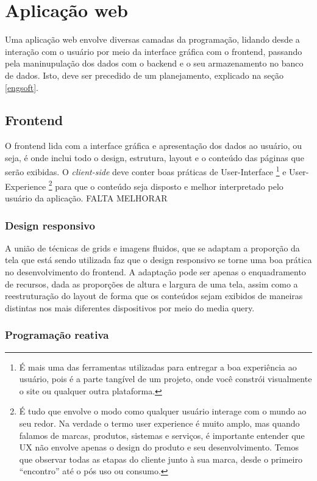 \section{Aplicação web}
Uma aplicação web envolve diversas camadas da programação, lidando desde a interação com o usuário por meio da interface gráfica com o frontend, passando pela maninupulação dos dados com o backend e o seu armazenamento no banco de dados. Isto, deve ser precedido de um planejamento, explicado na seção \ref{engsoft}.

\subsection{Frontend}
O frontend lida com a interface gráfica e apresentação dos dados ao usuário, ou seja, é onde inclui todo o design, estrutura, layout e o conteúdo das páginas que serão exibidas. O \textit{client-side} deve conter boas práticas de User-Interface
\footnote{É mais uma das ferramentas utilizadas para entregar a boa experiência ao usuário, pois é a parte tangível de um projeto, onde você constrói visualmente o site ou qualquer outra plataforma.}
e User-Experience
\footnote{É tudo que envolve o modo como qualquer usuário interage com o mundo ao seu redor. Na verdade o termo user experience é muito amplo, mas quando falamos de marcas, produtos, sistemas e serviços, é importante entender que UX não envolve apenas o design do produto e seu desenvolvimento. Temos que observar todas as etapas do cliente junto à sua marca, desde o primeiro “encontro” até o pós uso ou consumo.} para que o conteúdo seja disposto e melhor interpretado pelo usuário da aplicação. FALTA MELHORAR

\subsubsection{Design responsivo}
A união de técnicas de grids e imagens fluidos, que se adaptam a proporção da tela que está sendo utilizada faz que o design responsivo se torne uma boa prática no desenvolvimento do frontend. A adaptação pode ser apenas o enquadramento de recursos, dada as proporções de altura e largura de uma tela, assim como a reestruturação do layout de forma que os conteúdos sejam exibidos de maneiras distintas nos mais diferentes dispositivos por meio do media query. \cite{MOZILA}

\subsubsection{Programação reativa}
